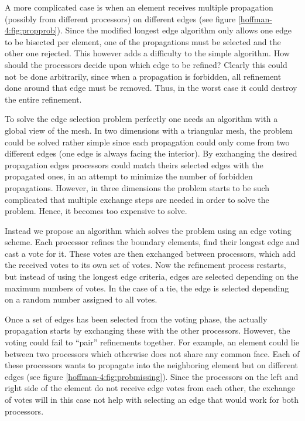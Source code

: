A more complicated case is when an element receives multiple
propagation (possibly from different processors) on different edges
(see figure \ref{hoffman-4:fig:propprob}). Since the modified longest edge
algorithm only allows one edge to be bisected per element, one of the
propagations must be selected and the other one rejected. This however
adds a difficulty to the simple algorithm. How should the processors
decide upon which edge to be refined? Clearly this could not be done
arbitrarily, since when a propagation is forbidden, all refinement
done around that edge must be removed. Thus, in the worst case it
could destroy the entire refinement. 

To solve the edge selection problem perfectly one needs an algorithm
with a global view of the mesh. In two dimensions with a triangular
mesh, the problem could be solved rather simple since each propagation
could only come from two different edges (one edge is always facing
the interior). By exchanging the desired propagation edges processors
could match theirs selected edges with the propagated ones, in an
attempt to minimize the number of forbidden propagations. However, in
three dimensions the problem starts to be such complicated that
multiple exchange steps are needed in order to solve the
problem. Hence, it becomes too expensive to solve.

Instead we propose an algorithm which solves the problem using an edge
voting scheme. Each processor refines the boundary elements, find
their longest edge and cast a vote for it. These votes are then
exchanged between processors, which add the received votes to its own
set of votes. Now the refinement process restarts, but instead of
using the longest edge criteria, edges are selected depending on the
maximum numbers of votes. In the case of a tie, the edge is selected
depending on a random number assigned to all votes.

Once a set of edges has been selected from the voting phase, the
actually propagation starts by exchanging these with the other
processors. However, the voting could fail to ``pair'' refinements
together. For example, an element could lie between two processors
which otherwise does not share any common face. Each of these
processors wants to propagate into the neighboring element but on
different edges (see figure \ref{hoffman-4:fig:probmissing}). Since the
processors on the left and right side of the element do not receive
edge votes from each other, the exchange of votes will in this case
not help with selecting an edge that would work for both processors.

